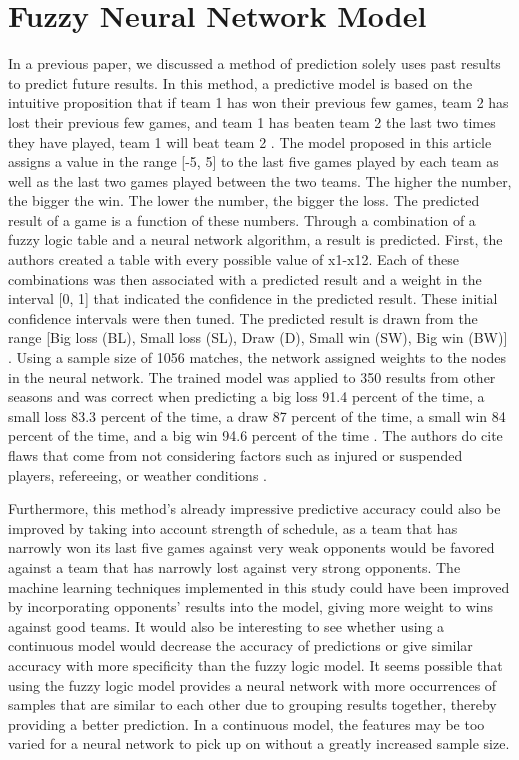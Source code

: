 \documentclass[sigconf]{acmart}
\begin{document}
\section{Fuzzy Neural Network Model}
In a previous paper, we discussed a method of prediction solely uses past results to predict future results. In this method, a predictive model is based on the intuitive proposition that if team 1 has won their previous few games, team 2 has lost their previous few games, and team 1 has beaten team 2 the last two times they have played, team 1 will beat team 2 \cite{FuzzyModel}. The model proposed in this article assigns a value in the range [-5, 5] to the last five games played by each team as well as the last two games played between the two teams. The higher the number, the bigger the win. The lower the number, the bigger the loss. The predicted result of a game is a function of these numbers. Through a combination of a fuzzy logic table and a neural network algorithm, a result is predicted. First, the authors created a table with every possible value of x1-x12. Each of these combinations was then associated with a predicted result and a weight in the interval [0, 1] that indicated the confidence in the predicted result. These initial confidence intervals were then tuned. The predicted result is drawn from the range [Big loss (BL), Small loss (SL), Draw (D), Small win (SW), Big win (BW)] \cite{FuzzyModel}. Using a sample size of 1056 matches, the network assigned weights to the nodes in the neural network. The trained model was applied to 350 results from other seasons and was correct when predicting a big loss 91.4 percent of the time, a small loss 83.3 percent of the time, a draw 87 percent of the time, a small win 84 percent of the time, and a big win 94.6 percent of the time \cite{FuzzyModel}. The authors do cite flaws that come from not considering factors such as injured or suspended players, refereeing, or weather conditions \cite{FuzzyModel}.

Furthermore, this method's already impressive predictive accuracy could also be improved by taking into account strength of schedule, as a team that has narrowly won its last five games against very weak opponents would be favored against a team that has narrowly lost against very strong opponents. The machine learning techniques implemented in this study could have been improved by incorporating opponents' results into the model, giving more weight to wins against good teams. \cite{paper2} It would also be interesting to see whether using a continuous model would decrease the accuracy of predictions or give similar accuracy with more specificity than the fuzzy logic model. It seems possible that using the fuzzy logic model provides a neural network with more occurrences of samples that are similar to each other due to grouping results together, thereby providing a better prediction. In a continuous model, the features may be too varied for a neural network to pick up on without a greatly increased sample size.
\end{document}
